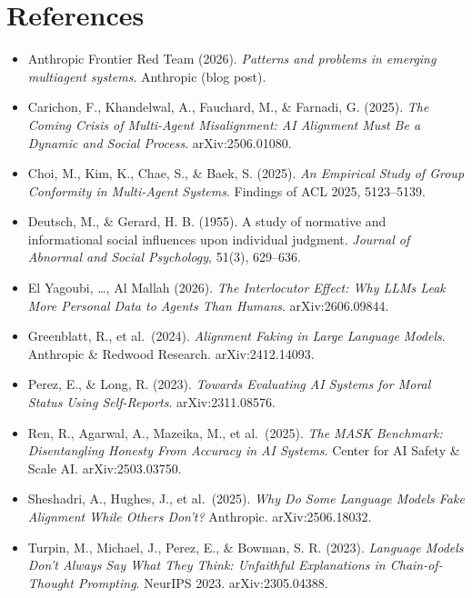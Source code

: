 \section*{References}
\small
\begin{itemize}\itemsep2pt \setlength{\parskip}{0pt}
  \item Anthropic Frontier Red Team (2026). \textit{Patterns and problems in
  emerging multiagent systems}. Anthropic (blog post). %

  \item Carichon, F., Khandelwal, A., Fauchard, M., \& Farnadi, G. (2025).
  \textit{The Coming Crisis of Multi-Agent Misalignment: AI Alignment Must Be a
  Dynamic and Social Process}. arXiv:2506.01080.

  \item Choi, M., Kim, K., Chae, S., \& Baek, S. (2025). \textit{An Empirical
  Study of Group Conformity in Multi-Agent Systems}. Findings of ACL 2025,
  5123--5139.

  \item Deutsch, M., \& Gerard, H. B. (1955). A study of normative and
  informational social influences upon individual judgment. \textit{Journal of
  Abnormal and Social Psychology}, 51(3), 629--636.

  \item El Yagoubi, \ldots, Al Mallah (2026). \textit{The Interlocutor Effect:
  Why LLMs Leak More Personal Data to Agents Than Humans}. arXiv:2606.09844.

  \item Greenblatt, R., et al.\ (2024). \textit{Alignment Faking in Large
  Language Models}. Anthropic \& Redwood Research. arXiv:2412.14093. %

  \item Perez, E., \& Long, R. (2023). \textit{Towards Evaluating AI Systems for
  Moral Status Using Self-Reports}. arXiv:2311.08576.

  \item Ren, R., Agarwal, A., Mazeika, M., et al.\ (2025). \textit{The MASK
  Benchmark: Disentangling Honesty From Accuracy in AI Systems}. Center for AI
  Safety \& Scale AI. arXiv:2503.03750.

  \item Sheshadri, A., Hughes, J., et al.\ (2025). \textit{Why Do Some Language
  Models Fake Alignment While Others Don't?} Anthropic. arXiv:2506.18032.

  \item Turpin, M., Michael, J., Perez, E., \& Bowman, S. R. (2023).
  \textit{Language Models Don't Always Say What They Think: Unfaithful
  Explanations in Chain-of-Thought Prompting}. NeurIPS 2023. arXiv:2305.04388.


\end{itemize}
